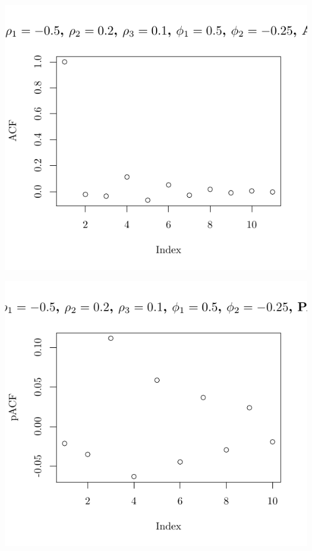 \documentclass[10pt]{paper}\usepackage[]{graphicx}\usepackage[]{color}
\makeatletter
\def\maxwidth{ %
  \ifdim\Gin@nat@width>\linewidth
    \linewidth
  \else
    \Gin@nat@width
  \fi
}
\newenvironment{knitrout}{}{} %
\makeatother
\begin{document}
\begin{knitrout}
{\centering \includegraphics[width=\maxwidth]{figure/graphics-plotter-173} 

}




{\centering \includegraphics[width=\maxwidth]{figure/graphics-plotter-174} 

}





\end{knitrout}
\end{document}
